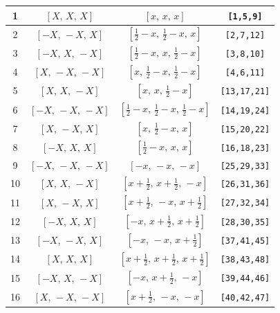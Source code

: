 \documentclass[fleqn,8pt]{jsarticle}
\begin{document}
\begin{longtable}{cccc}
1 & $\left[ X,\, X,\, X \right]$ & $\left[ x,\, x,\, x \right]$ & {\tt [1,5,9]} \\ \hline
2 & $\left[ - X,\, - X,\, X \right]$ & $\left[ \frac{1}{2} - x,\, \frac{1}{2} - x,\, x \right]$ & {\tt [2,7,12]} \\ \hline
3 & $\left[ - X,\, X,\, - X \right]$ & $\left[ \frac{1}{2} - x,\, x,\, \frac{1}{2} - x \right]$ & {\tt [3,8,10]} \\ \hline
4 & $\left[ X,\, - X,\, - X \right]$ & $\left[ x,\, \frac{1}{2} - x,\, \frac{1}{2} - x \right]$ & {\tt [4,6,11]} \\ \hline
5 & $\left[ X,\, X,\, - X \right]$ & $\left[ x,\, x,\, \frac{1}{2} - x \right]$ & {\tt [13,17,21]} \\ \hline
6 & $\left[ - X,\, - X,\, - X \right]$ & $\left[ \frac{1}{2} - x,\, \frac{1}{2} - x,\, \frac{1}{2} - x \right]$ & {\tt [14,19,24]} \\ \hline
7 & $\left[ X,\, - X,\, X \right]$ & $\left[ x,\, \frac{1}{2} - x,\, x \right]$ & {\tt [15,20,22]} \\ \hline
8 & $\left[ - X,\, X,\, X \right]$ & $\left[ \frac{1}{2} - x,\, x,\, x \right]$ & {\tt [16,18,23]} \\ \hline
9 & $\left[ - X,\, - X,\, - X \right]$ & $\left[ - x,\, - x,\, - x \right]$ & {\tt [25,29,33]} \\ \hline
10 & $\left[ X,\, X,\, - X \right]$ & $\left[ x + \frac{1}{2},\, x + \frac{1}{2},\, - x \right]$ & {\tt [26,31,36]} \\ \hline
11 & $\left[ X,\, - X,\, X \right]$ & $\left[ x + \frac{1}{2},\, - x,\, x + \frac{1}{2} \right]$ & {\tt [27,32,34]} \\ \hline
12 & $\left[ - X,\, X,\, X \right]$ & $\left[ - x,\, x + \frac{1}{2},\, x + \frac{1}{2} \right]$ & {\tt [28,30,35]} \\ \hline
13 & $\left[ - X,\, - X,\, X \right]$ & $\left[ - x,\, - x,\, x + \frac{1}{2} \right]$ & {\tt [37,41,45]} \\ \hline
14 & $\left[ X,\, X,\, X \right]$ & $\left[ x + \frac{1}{2},\, x + \frac{1}{2},\, x + \frac{1}{2} \right]$ & {\tt [38,43,48]} \\ \hline
15 & $\left[ - X,\, X,\, - X \right]$ & $\left[ - x,\, x + \frac{1}{2},\, - x \right]$ & {\tt [39,44,46]} \\ \hline
16 & $\left[ X,\, - X,\, - X \right]$ & $\left[ x + \frac{1}{2},\, - x,\, - x \right]$ & {\tt [40,42,47]} \\
\end{longtable}
\renewcommand{\arraystretch}{1.2}
\end{document}
